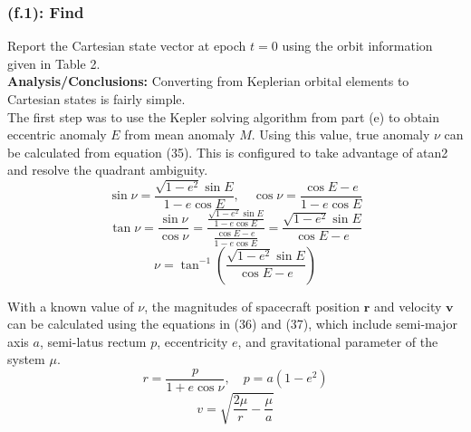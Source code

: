 \documentclass[titlepage]{article}
\begin{document}
\begin{table}[H]
	\centering
	\caption{Reference orbit}
	\label{tab:reference_orbit}
\end{table}

\subsubsection*{(f.1): Find}
Report the Cartesian state vector at epoch $t=0$ using the orbit information given in Table 2.\\

\textbf{Analysis/Conclusions:}
Converting from Keplerian orbital elements to Cartesian states is fairly simple.\\

The first step was to use the Kepler solving algorithm from part (e) to obtain eccentric anomaly $E$ from mean anomaly $M$. Using this value, true anomaly $\nu$ can be calculated from equation (35). This is configured to take advantage of atan2 and resolve the quadrant ambiguity.
\begin{equation*}
	\sin{\nu}=\frac{\sqrt{1-e^2}\sin{E}}{1-e\cos{E}},\quad \cos{\nu}=\frac{\cos{E}-e}{1-e\cos{E}}
\end{equation*}
\begin{equation}
	\tan{\nu}=\frac{\sin{\nu}}{\cos{\nu}}=\frac{\frac{\sqrt{1-e^2}\sin{E}}{1-e\cos{E}}}{\frac{\cos{E}-e}{1-e\cos{E}}}=\frac{\sqrt{1-e^2}\sin{E}}{\cos{E}-e}
\end{equation}
\begin{equation*}
	\nu = \tan^{-1}\left(\frac{\sqrt{1-e^2}\sin{E}}{\cos{E}-e}\right)
\end{equation*}

With a known value of $\nu$, the magnitudes of spacecraft position $\boldsymbol{r}$ and velocity $\boldsymbol{v}$ can be calculated using the equations in (36) and (37), which include semi-major axis $a$, semi-latus rectum $p$, eccentricity $e$, and gravitational parameter of the system $\mu$.
\begin{equation}
	r=\frac{p}{1+e\cos{\nu}},\quad p=a(1-e^2)
\end{equation}
\begin{equation}
	v=\sqrt{\frac{2\mu}{r}-\frac{\mu}{a}}
\end{equation}
\end{document}

